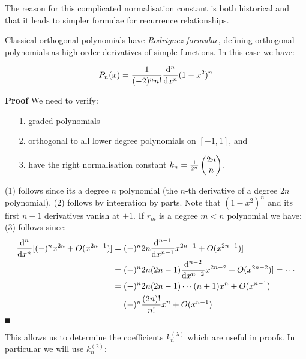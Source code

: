 The reason for this complicated normalisation constant is both historical and that it leads to simpler formulae for recurrence relationships.

Classical orthogonal polynomials have \emph{Rodriguez formulae}, defining orthogonal polynomials as high order derivatives of simple functions. In this case we have:

\begin{lemma}
\[
P_n(x) = {1 \over (-2)^n n!}{{\rm d}^n \over {\rm d} x^n} (1-x^2)^n
\]
\end{lemma}
\textbf{Proof} We need to verify:

\begin{itemize}
\item[1. ] graded polynomials


\item[2. ] orthogonal to all lower degree polynomials on $[-1,1]$, and


\item[3. ] have the right normalisation constant $k_n = {1 \over 2^n} \begin{pmatrix} 2n \\ n \end{pmatrix}$.

\end{itemize}
(1) follows since its a degree $n$ polynomial (the $n$-th derivative of a degree $2n$ polynomial). (2) follows by integration by parts. Note that $(1-x^2)^n$ and its first $n-1$ derivatives vanish at $\ensuremath{\pm}1$. If $r_m$ is a degree $m < n$ polynomial we have:
(3) follows since:
\begin{align*}
{{\rm d}^n \over {\rm d} x^n}[(-)^n x^{2n} + O(x^{2n-1})] &=
(-)^n 2n {{\rm d}^{n-1} \over {\rm d} x^{n-1}} x^{2n-1}+ O(x^{2n-1})] \\
&=
(-)^n 2n (2n-1) {{\rm d}^{n-2} \over {\rm d} x^{n-2}} x^{2n-2}+ O(x^{2n-2})] = \ensuremath{\cdots} \\
&= (-)^n 2n (2n-1) \ensuremath{\cdots} (n+1) x^n + O(x^{n-1}) \ccr 
=
(-)^n {(2n)! \over n!} x^n + O(x^{n-1})
\end{align*}
\ensuremath{\QED}

This allows us to determine the coefficients $k_n^{(\ensuremath{\lambda})}$ which are useful in proofs. In particular we will use $k_n^{(2)}$:

